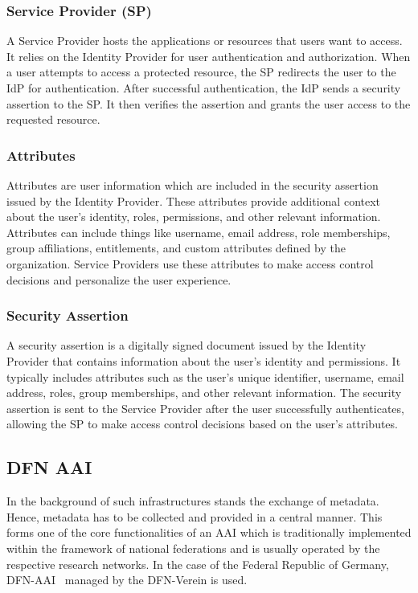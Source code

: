 \subsubsection*{Service Provider (SP)}
A Service Provider hosts the applications or resources that users want to
access. It relies on the Identity Provider for user authentication and
authorization. When a user attempts to access a protected resource, the SP
redirects the user to the IdP for authentication. After successful
authentication, the IdP sends a security assertion to the SP. It then verifies
the assertion and grants the user access to the requested resource.

\subsubsection*{Attributes}
Attributes are user information which are included in the security assertion
issued by the Identity Provider. These attributes provide additional context
about the user's identity, roles, permissions, and other relevant information.
Attributes can include things like username, email address, role memberships,
group affiliations, entitlements, and custom attributes defined by the
organization. Service Providers use these attributes to make access control
decisions and personalize the user experience.

\subsubsection*{Security Assertion}
A security assertion is a digitally signed document issued by the Identity
Provider that contains information about the user's identity and permissions. It
typically includes attributes such as the user's unique identifier, username,
email address, roles, group memberships, and other relevant information. The
security assertion is sent to the Service Provider after the user successfully
authenticates, allowing the SP to make access control decisions based on the
user's attributes.

\subsection*{DFN AAI}
In the background of such infrastructures stands the exchange of metadata.
Hence, metadata has to be collected and provided in a central manner. This forms
one of the core functionalities of an AAI which is traditionally implemented
within the framework of national federations and is usually operated by the
respective research networks. In the case of the Federal Republic of Germany,
DFN-AAI~\cite{DFNAAI} managed by the DFN-Verein is used.

